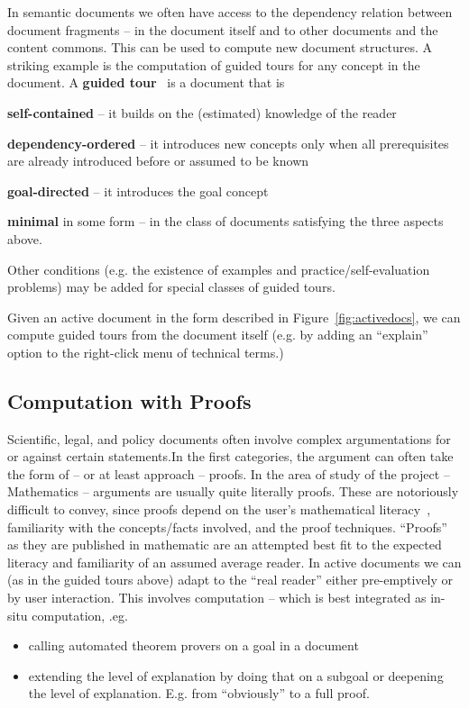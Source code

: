 In semantic documents we often have access to the dependency relation between document
fragments -- in the document itself and to other documents and the content commons. This
can be used to compute new document structures. A striking example is the computation of
guided tours for any concept in the document. A \textbf{guided
  tour}~\cite{KohDavGin:psewads11} is a document that is 
\begin{compactitem}
\item \textbf{self-contained} -- it builds on the (estimated) knowledge of the reader 
\item \textbf{dependency-ordered} -- it introduces new concepts only when all prerequisites are
  already introduced before or assumed to be known
\item \textbf{goal-directed} -- it introduces the goal concept
\item \textbf{minimal} in some form -- in the class of documents satisfying the three
  aspects above.
\end{compactitem}
Other conditions (e.g. the existence of examples and practice/self-evaluation problems)
may be added for special classes of guided tours.

Given an active document in the form described in Figure~\ref{fig:activedocs}, we can
compute guided tours from the document itself (e.g. by adding an ``explain'' option to the
right-click menu of technical terms.)

\subsection{Computation with Proofs}\label{sec:ex:proofs}

Scientific, legal, and policy documents often involve complex argumentations for or
against certain statements.In the first categories, the argument can often take the form
of -- or at least approach -- proofs. In the area of study of the \pn project --
Mathematics -- arguments are usually quite literally proofs. These are notoriously
difficult to convey, since proofs depend on the user's mathematical
literacy~\cite{IanKoh:mlkmim15}, familiarity with the concepts/facts involved, and the
proof techniques. ``Proofs'' as they are published in mathematic are an attempted best fit
to the expected literacy and familiarity of an assumed average reader. In active documents
we can (as in the guided tours above) adapt to the ``real reader'' either pre-emptively or
by user interaction. This involves computation -- which is best integrated as in-situ
computation, .eg.  
\begin{itemize}
  \item calling automated theorem provers on a goal in a document
  \item extending the level of explanation by doing that on a subgoal or deepening the
    level of explanation. E.g. from ``obviously'' to a full proof.
  \end{itemize}






